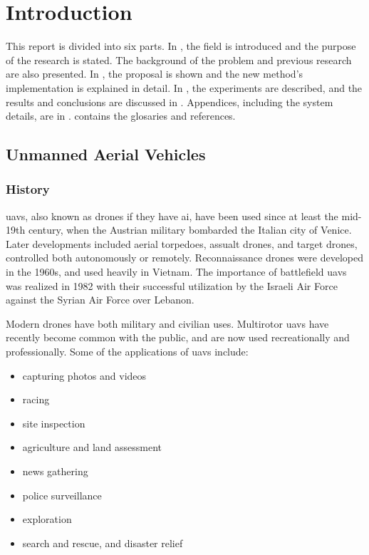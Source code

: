 \chapter{Introduction}
\label{ch:intro}

This report is divided into six parts.
In , the field is introduced and the purpose of the research is stated.
The background of the problem and previous research are also presented.
In , the proposal is shown and the new method's implementation is explained in detail.
In , the experiments are described, and the results and conclusions are discussed in .
Appendices, including the system details, are in .
 contains the glosaries and references.

\section{Unmanned Aerial Vehicles}
\subsection{History}
\Glspl{uav}, also known as drones if they have \gls{ai}, have been used since at least the mid-19th century, when the Austrian military bombarded the Italian city of Venice.\cite{monash2003}
Later developments included aerial torpedoes, assualt drones, and target drones, controlled both autonomously or remotely.
Reconnaissance drones were developed in the 1960s, and used heavily in Vietnam.
The importance of battlefield \glspl{uav} was realized in 1982 with their successful utilization by the Israeli Air Force against the Syrian Air Force over Lebanon.\cite{draganfly2009}

Modern drones have both military and civilian uses.
Multirotor \glspl{uav} have recently become common with the public, and are now used recreationally and professionally.
Some of the applications of \glspl{uav} include:

\begin{itemize}
  \item capturing photos and videos
  \item racing
  \item site inspection
  \item agriculture and land assessment
  \item news gathering
  \item police surveillance
  \item exploration
  \item search and rescue, and disaster relief
\end{itemize}

